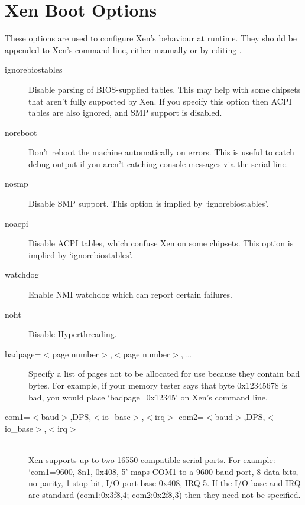 \documentclass[11pt,twoside,final,openright]{report}
\begin{document}
{\section{Xen Boot Options}
\label{s:xboot}

These options are used to configure Xen's behaviour at runtime.  They
should be appended to Xen's command line, either manually or by
editing .

\begin{description}
\item [ignorebiostables ] 
 Disable parsing of BIOS-supplied tables. This may help with some
 chipsets that aren't fully supported by Xen. If you specify this
 option then ACPI tables are also ignored, and SMP support is
 disabled. 

\item [noreboot ] 
 Don't reboot the machine automatically on errors.  This is
 useful to catch debug output if you aren't catching console messages
 via the serial line. 

\item [nosmp ] 
 Disable SMP support.
 This option is implied by `ignorebiostables'. 

\item [noacpi ] 
 Disable ACPI tables, which confuse Xen on some chipsets.
 This option is implied by `ignorebiostables'. 

\item [watchdog ] 
 Enable NMI watchdog which can report certain failures. 

\item [noht ] 
 Disable Hyperthreading. 

\item [badpage=$<$page number$>$,$<$page number$>$, \ldots ] 
 Specify a list of pages not to be allocated for use 
 because they contain bad bytes. For example, if your
 memory tester says that byte 0x12345678 is bad, you would
 place `badpage=0x12345' on Xen's command line. 

\item [com1=$<$baud$>$,DPS,$<$io\_base$>$,$<$irq$>$
 com2=$<$baud$>$,DPS,$<$io\_base$>$,$<$irq$>$ ] \mbox{}\\ 
 Xen supports up to two 16550-compatible serial ports.
 For example: `com1=9600, 8n1, 0x408, 5' maps COM1 to a
 9600-baud port, 8 data bits, no parity, 1 stop bit,
 I/O port base 0x408, IRQ 5.
 If the I/O base and IRQ are standard (com1:0x3f8,4;
 com2:0x2f8,3) then they need not be specified. 


\end{description}}
\end{document}
